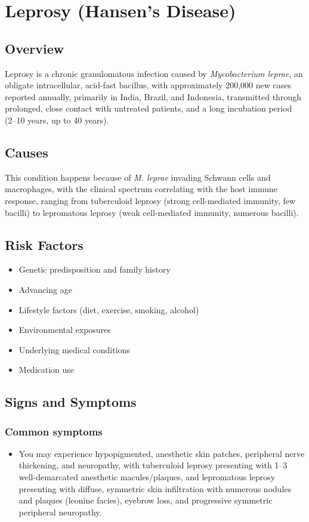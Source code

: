 \chapter{Leprosy (Hansen's Disease)}
\label{sec:Leprosy}

\section{Overview}
Leprosy is a chronic granulomatous infection caused by \textit{Mycobacterium leprae}, an obligate intracellular, acid-fast bacillus, with approximately 200,000 new cases reported annually, primarily in India, Brazil, and Indonesia, transmitted through prolonged, close contact with untreated patients, and a long incubation period (2--10 years, up to 40 years).
\section{Causes}
This condition happens because of \textit{M. leprae} invading Schwann cells and macrophages, with the clinical spectrum correlating with the host immune response, ranging from tuberculoid leprosy (strong cell-mediated immunity, few bacilli) to lepromatous leprosy (weak cell-mediated immunity, numerous bacilli).     
\section{Risk Factors}

\begin{itemize}[noitemsep]
  \item Genetic predisposition and family history
  \item Advancing age
  \item Lifestyle factors (diet, exercise, smoking, alcohol)
  \item Environmental exposures
  \item Underlying medical conditions
  \item Medication use
\end{itemize}
\section{Signs and Symptoms}

\subsection{Common symptoms}
\begin{itemize}[noitemsep]
  \item You may experience hypopigmented, anesthetic skin patches, peripheral nerve thickening, and neuropathy, with tuberculoid leprosy presenting with 1--3 well-demarcated anesthetic macules/plaques, and lepromatous leprosy presenting with diffuse, symmetric skin infiltration with numerous nodules and plaques (leonine facies), eyebrow loss, and progressive symmetric peripheral neuropathy. 
  \end{itemize}

